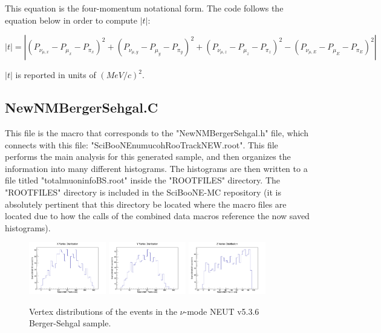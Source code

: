 \documentclass[11pt]{article}
\begin{document}
\noindent
This equation is the four-momentum notational form. The code follows the equation below in order to compute $|t|$:

\begin{equation}
|t| = |(P_{\nu_{\mu,x}} - P_{\mu_x} - P_{\pi_x})^2 + (P_{\nu_{\mu,y}} - P_{\mu_y} - P_{\pi_y})^2 + (P_{\nu_{\mu,z}} - P_{\mu_z} - P_{\pi_z})^2 - (P_{\nu_{\mu,E}} - P_{\mu_E} - P_{\pi_E})^2|
\end{equation}

\noindent
$|t|$ is reported in units of $(MeV/c)^2$.

\subsection{NewNMBergerSehgal.C}
\label{sub:NewNMBergerSehgal.C}
This file is the macro that corresponds to the "NewNMBergerSehgal.h" file, which connects with this file: "SciBooNE\textunderscore numu\textunderscore coh\textunderscore RooTrack\textunderscore NEW.root". This file performs the main analysis for this generated sample, and then organizes the information into many different histograms. The histograms are then written to a file titled "totalmuoninfoBS.root" inside the "ROOTFILES" directory. The "ROOTFILES" directory is included in the SciBooNE-MC repository (it is absolutely pertinent that this directory be located where the macro files are located due to how the calls of the combined data macros reference the now saved histograms).

\begin{figure}[H]
\centering
\includegraphics[width=0.3\textwidth]{NewNMBergerSehgalImages/4-XVertexDistributionNMBS.png}
\includegraphics[width=0.3\textwidth]{NewNMBergerSehgalImages/3-YVertexDistributionNMBS.png}
\includegraphics[width=0.3\textwidth]{NewNMBergerSehgalImages/2-ZVertexDistributionNMBS.png}
\caption{Vertex distributions of the events in the $\nu$-mode NEUT v5.3.6 Berger-Sehgal sample.}
\label{fig:app:NMVertexDistributionBS}
\end{figure}
\end{document}

